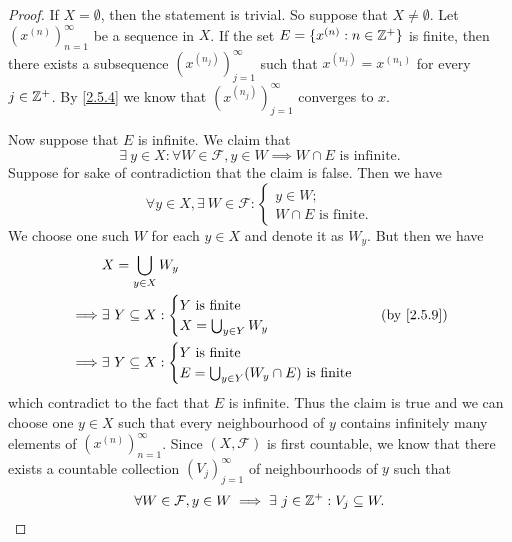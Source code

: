 \begin{proof}
  If \(X = \emptyset\), then the statement is trivial.
  So suppose that \(X \neq \emptyset\).
  Let \((x^{(n)})_{n = 1}^\infty\) be a sequence in \(X\).
  If the set \(E = \{x^{(n)} : n \in \mathbb{Z}^+\}\) is finite, then there exists a subsequence \((x^{(n_j)})_{j = 1}^\infty\) such that \(x^{(n_j)} = x^{(n_1)}\) for every \(j \in \mathbb{Z}^+\).
  By \cref{2.5.4} we know that \((x^{(n_j)})_{j = 1}^\infty\) converges to \(x\).

  Now suppose that \(E\) is infinite.
  We claim that
  \[
    \exists\ y \in X : \forall W \in \mathcal{F}, y \in W \implies W \cap E \text{ is infinite}.
  \]
  Suppose for sake of contradiction that the claim is false.
  Then we have
  \[
    \forall y \in X, \exists\ W \in \mathcal{F} : \begin{cases}
      y \in W; \\
      W \cap E \text{ is finite}.
    \end{cases}
  \]
  We choose one such \(W\) for each \(y \in X\) and denote it as \(W_y\).
  But then we have
  \begin{align*}
             & X = \bigcup_{y \in X} W_y                                                     \\
    \implies & \exists\ Y \subseteq X : \begin{cases}
                                          Y \text{ is finite} \\
                                          X = \bigcup_{y \in Y} W_y
                                        \end{cases}               & \text{(by \cref{2.5.9})} \\
    \implies & \exists\ Y \subseteq X : \begin{cases}
                                          Y \text{ is finite} \\
                                          E = \bigcup_{y \in Y} (W_y \cap E) \text{ is finite}
                                        \end{cases}
  \end{align*}
  which contradict to the fact that \(E\) is infinite.
  Thus the claim is true and we can choose one \(y \in X\) such that every neighbourhood of \(y\) contains infinitely many elements of \((x^{(n)})_{n = 1}^\infty\).
  Since \((X, \mathcal{F})\) is first countable, we know that there exists a countable collection \((V_j)_{j = 1}^\infty\) of neighbourhoods of \(y\) such that
  \[
    \forall W \in \mathcal{F}, y \in W \implies \exists\ j \in \mathbb{Z}^+ : V_j \subseteq W.
\]
\end{proof}
